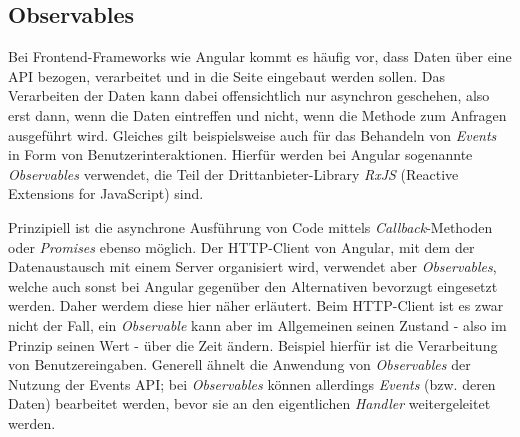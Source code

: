 \subsection{Observables}
\label{sec:technologies:angular:observables}
Bei Frontend-Frameworks wie Angular kommt es häufig vor, dass Daten über eine \acs{API} bezogen, verarbeitet und in die Seite eingebaut werden sollen. Das Verarbeiten der Daten kann dabei offensichtlich nur asynchron geschehen, also erst dann, wenn die Daten eintreffen und nicht, wenn die Methode zum Anfragen ausgeführt wird. Gleiches gilt beispielsweise auch für das Behandeln von \textit{Events} in Form von Benutzerinteraktionen. Hierfür werden bei Angular sogenannte \textit{Observables} verwendet, die Teil der Drittanbieter-Library \textit{RxJS} (Reactive Extensions for JavaScript) sind\cite{RxJS}.

Prinzipiell ist die asynchrone Ausführung von Code mittels \textit{Callback}-Methoden oder \textit{Promises} ebenso möglich. Der \acs{HTTP}-Client von Angular, mit dem der Datenaustausch mit einem Server organisiert wird, verwendet aber \textit{Observables}, welche auch sonst bei Angular gegenüber den Alternativen bevorzugt eingesetzt werden\cite{Observables}. Daher werdem diese hier näher erläutert. Beim \acs{HTTP}-Client ist es zwar nicht der Fall, ein \textit{Observable} kann aber im Allgemeinen seinen Zustand - also im Prinzip seinen Wert - über die Zeit ändern. Beispiel hierfür ist die Verarbeitung von Benutzereingaben. Generell ähnelt die Anwendung von \textit{Observables} der Nutzung der Events API; bei \textit{Observables} können allerdings \textit{Events} (bzw. deren Daten) bearbeitet werden, bevor sie an den eigentlichen \textit{Handler} weitergeleitet werden\cite{ObservableEvent}.

